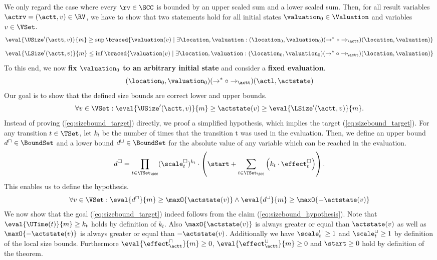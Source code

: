 We only regard the case where every $\rv \in \SCC$ is bounded by an upper scaled sum and a lower scaled sum.
Then, for all result variables $\actrv = (\actt, v) \in \RV$, we have to show that two statements hold for all initial states $\valuation_0 \in \Valuation$ and variables $v \in \VSet$.
\[ \eval{\USize'(\actt, v)}{m} \geq \sup \braced{ \valuation(v) \mid \exists \location, \valuation: (\location_0, \valuation_0) (\rightarrow^* \circ \rightarrow_\actt) (\location, \valuation)} \]
\[ \eval{\LSize'(\actt, v)}{m} \leq \inf \braced{ \valuation(v) \mid \exists \location, \valuation: (\location_0, \valuation_0) (\rightarrow^* \circ \rightarrow_\actt) (\location, \valuation)} \]
To this end, we now \textbf{fix $\valuation_0$ to an arbitrary initial state} and consider a \textbf{fixed evaluation}.
\[ (\location_0, \valuation_0) (\rightarrow^* \circ \rightarrow_\actt) (\actl, \actstate) \]
Our goal is to show that the defined size bounds are correct lower and upper bounds.
\begin{equation} \label{eq:sizebound_target}
  \forall v \in \VSet: \eval{\USize'(\actt, v)}{m} \geq \actstate(v) \geq \eval{\LSize'(\actt, v)}{m}.
\end{equation}
Instead of proving (\ref{eq:sizebound_target}) directly, we proof a simplified hypothesis, which implies the target (\ref{eq:sizebound_target}).
For any transition $t \in \TSet$, let $k_t$ be the number of times that the transition t was used in the evaluation.
Then, we define an upper bound $d^\sqcap \in \BoundSet$ and a lower bound $d^\sqcup \in \BoundSet$ for the absolute value of any variable which can be reached in the evaluation.
\[ d^\square = \prod_{t \in \TSet_\SCC} (\scale^\square_t)^{k_t} \cdot \left( \start + \sum_{t \in \TSet_\SCC} \left( k_t \cdot \effect^\square_t \right) \right). \]
This enables us to define the hypothesis.
\begin{equation} \label{eq:sizebound_hypothesis}
  \forall v \in \VSet: \eval{d^\sqcap}{m} \geq \maxO{\actstate(v)} \wedge \eval{d^\sqcup}{m} \geq \maxO{-\actstate(v)}
\end{equation}
We now show that the goal (\ref{eq:sizebound_target}) indeed follows from the claim (\ref{eq:sizebound_hypothesis}).
Note that $\eval{\UTime(t)}{m} \geq k_t$ holds by definition of $k_t$.
Also $\maxO{\actstate(v)}$ is always greater or equal than $\actstate(v)$ as well as $\maxO{-\actstate(v)}$ is always greater or equal than $-\actstate(v)$.
Additionally we have $\scale^\sqcap_t \geq 1$ and $\scale^\sqcup_t \geq 1$ by definition of the local size bounds.
Furthermore $\eval{\effect^\sqcap_\actt}{m} \geq 0$, $\eval{\effect^\sqcup_\actt}{m} \geq 0$ and $\start \geq 0$ hold by definition of the theorem.
